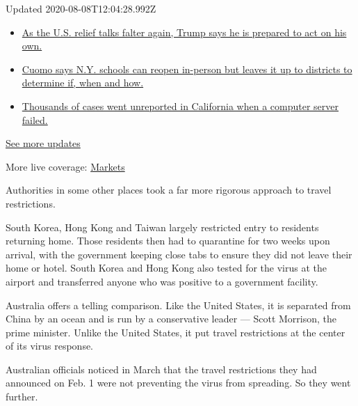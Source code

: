 Updated 2020-08-08T12:04:28.992Z

\begin{itemize}
\tightlist
\item
  \href{https://www.nytimes.com/2020/08/07/world/covid-19-news.html?action=click\&pgtype=Article\&state=default\&region=MAIN_CONTENT_1\&context=storylines_live_updates\#link-1f86d03a}{As
  the U.S. relief talks falter again, Trump says he is prepared to act
  on his own.}
\item
  \href{https://www.nytimes.com/2020/08/07/world/covid-19-news.html?action=click\&pgtype=Article\&state=default\&region=MAIN_CONTENT_1\&context=storylines_live_updates\#link-3f64a70a}{Cuomo
  says N.Y. schools can reopen in-person but leaves it up to districts
  to determine if, when and how.}
\item
  \href{https://www.nytimes.com/2020/08/07/world/covid-19-news.html?action=click\&pgtype=Article\&state=default\&region=MAIN_CONTENT_1\&context=storylines_live_updates\#link-14e70066}{Thousands
  of cases went unreported in California when a computer server failed.}
\end{itemize}

\href{https://www.nytimes.com/2020/08/07/world/covid-19-news.html?action=click\&pgtype=Article\&state=default\&region=MAIN_CONTENT_1\&context=storylines_live_updates}{See
more updates}

More live coverage:
\href{https://www.nytimes.com/live/2020/08/07/business/stock-market-today-coronavirus?action=click\&pgtype=Article\&state=default\&region=MAIN_CONTENT_1\&context=storylines_live_updates}{Markets}

Authorities in some other places took a far more rigorous approach to
travel restrictions.

South Korea, Hong Kong and Taiwan largely restricted entry to residents
returning home. Those residents then had to quarantine for two weeks
upon arrival, with the government keeping close tabs to ensure they did
not leave their home or hotel. South Korea and Hong Kong also tested for
the virus at the airport and transferred anyone who was positive to a
government facility.

Australia offers a telling comparison. Like the United States, it is
separated from China by an ocean and is run by a conservative leader ---
Scott Morrison, the prime minister. Unlike the United States, it put
travel restrictions at the center of its virus response.

Australian officials noticed in March that the travel restrictions they
had announced on Feb. 1 were not preventing the virus from spreading. So
they went further.

